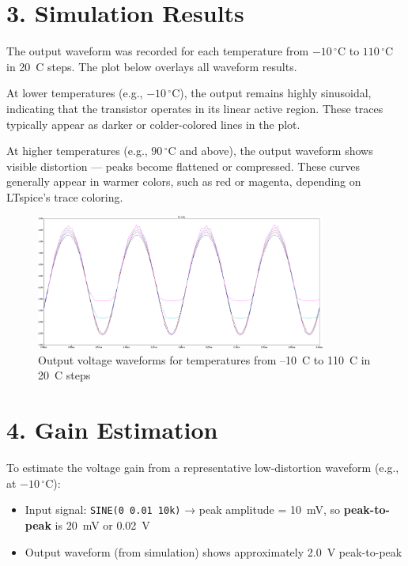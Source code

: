 \documentclass[12pt,a4paper]{article}
\begin{document}
\section*{3. Simulation Results}
The output waveform was recorded for each temperature from \(-10\,^{\circ}\mathrm{C}\) to \(110\,^{\circ}\mathrm{C}\) in 20~\textdegree C steps. The plot below overlays all waveform results. 

At lower temperatures (e.g., \(-10\,^{\circ}\mathrm{C}\)), the output remains highly sinusoidal, indicating that the transistor operates in its linear active region. These traces typically appear as darker or colder-colored lines in the plot.

At higher temperatures (e.g., \(90\,^{\circ}\mathrm{C}\) and above), the output waveform shows visible distortion — peaks become flattened or compressed. These curves generally appear in warmer colors, such as red or magenta, depending on LTspice’s trace coloring.

\begin{figure}[H]
    \centering
    \includegraphics[width=0.85\textwidth]{waveforms_all.png}
    \caption{Output voltage waveforms for temperatures from –10~\textdegree C to 110~\textdegree C in 20~\textdegree C steps}
\end{figure}

\section*{4. Gain Estimation}
To estimate the voltage gain from a representative low-distortion waveform (e.g., at \(-10\,^{\circ}\mathrm{C}\)):

\begin{itemize}
  \item Input signal: \texttt{SINE(0 0.01 10k)} → peak amplitude = \SI{10}{\milli\volt}, so \textbf{peak-to-peak} is \SI{20}{\milli\volt} or \SI{0.02}{\volt}
  \item Output waveform (from simulation) shows approximately \SI{2.0}{\volt} peak-to-peak
\end{itemize}
\end{document}
